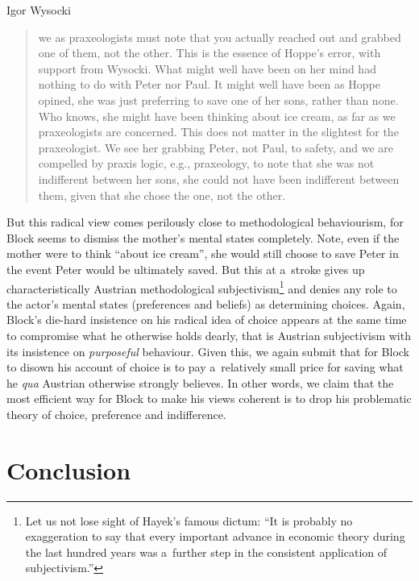 \begin{artengenv}{Igor Wysocki}
\begin{quote}
we as praxeologists must note that you actually reached out and grabbed one of them, not the other. This is the essence of Hoppe's error, with support from Wysocki. What might well have been on her mind had nothing to do with Peter nor Paul. It might well have been as Hoppe opined, she was just preferring to save one of her sons, rather than none. Who knows, she might have been thinking about ice cream, as far as we praxeologists are concerned. This does not matter in the slightest for the praxeologist. We see her grabbing Peter, not Paul, to safety, and we are compelled by praxis logic, e.g., praxeology, to note that she was not indifferent between her sons, she could not have been indifferent between them, given that she chose the one, not the other.
\end{quote}



But this radical view comes perilously close to methodological behaviourism, for Block seems to dismiss the mother's mental states completely. Note, even if the mother were to think ``about ice cream'', she would still choose to save Peter in the event Peter would be ultimately saved. But this at a~stroke gives up characteristically Austrian methodological subjectivism\footnote{Let us not lose sight of Hayek's 
\parencite*[][p.31]{hayek_counter-revolution_1952} %
 famous dictum: ``It is probably no exaggeration to say that every important advance in economic theory during the last hundred years was a~further step in the consistent application of subjectivism.'' } and denies any role to the actor's mental states (preferences and beliefs) as determining choices. Again, Block's die-hard insistence on his radical idea of choice appears at the same time to compromise what he otherwise holds dearly, that is Austrian subjectivism with its insistence on \textit{purposeful} behaviour. Given this, we again submit that for Block to disown his account of choice is to pay a~relatively small price for saving what he \textit{qua} Austrian otherwise strongly believes. In other words, we claim that the most efficient way for Block to make his views coherent is to drop his problematic theory of choice, preference and indifference.



\section{Conclusion}


\end{artengenv}
